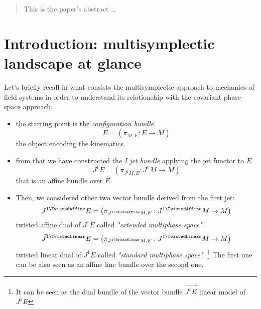 \documentclass[12pt]{article}
\begin{document}
\maketitle

\begin{abstract}
This is the paper's abstract \ldots
\end{abstract}

\section{Introduction: multisymplectic landscape at glance}
Let's briefly recall in what consists the multisymplectic approach to mechanics of field systems in order to understand its relationship with the covariant phase space approach.

\begin{figure}

\end{figure}

\begin{itemize}
 \item the starting point is the \emph{configuration bundle} 
 	\begin{displaymath}
 		E = \left( \pi_{M,E} : E\rightarrow M \right)
 	\end{displaymath}
 	the object encoding the kinematics.
 \item from that we have constructed the \emph{I jet bundle} applying the jet functor to $E$ 
 	\begin{displaymath}
 	J^1E = \left( \pi_{J^1 M,E} : J^1 M\rightarrow M \right)
 	\end{displaymath} 
 	that is an affine bundle over $E$.
 \item Then, we considered other two vector bundle derived from the first jet:
 	\begin{displaymath}
 	J^{1 \TwistedAffine}E = \left( \pi_{J^{1 \TwistedAffine} M,E} : J^{1 \TwistedAffine} M\rightarrow M \right)
 	\end{displaymath}
	twisted affine dual of $J^1E$ called \emph{"extended multiphase space"}.
	\begin{displaymath}
	\vec{J}^{1 \TwistedLinear}E = \left( \pi_{J^{1 \TwistedLinear} M,E} : J^{1 \TwistedLinear} M\rightarrow M \right)
	\end{displaymath}
	twisted linear dual of $J^1 E$ called \emph{"standard multiphase space"}. \footnote{It can be seen as the dual bundle of the vector bundle $\vec{J^1E}$ linear model of $J^1E$}
	The first one can be also seen as an affine line bundle over the second one.


\end{itemize}
\end{document}
